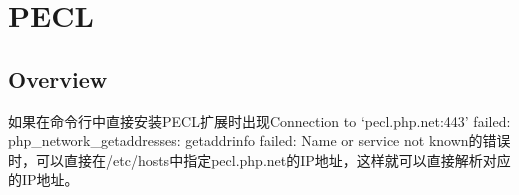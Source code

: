 \part{PECL}

\chapter{Overview}

如果在命令行中直接安装PECL扩展时出现Connection to `pecl.php.net:443' failed: php\_network\_getaddresses: getaddrinfo failed: Name or service not known的错误时，可以直接在/etc/hosts中指定pecl.php.net的IP地址，这样就可以直接解析对应的IP地址。
